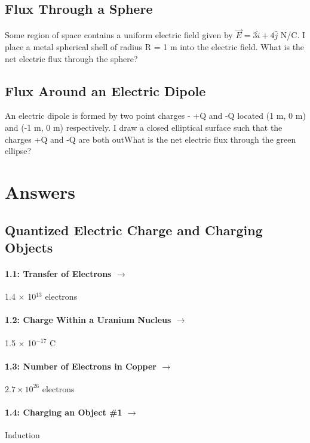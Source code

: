 \documentclass[11pt]{article}
\begin{document}
\subsection{Flux Through a Sphere}
Some region of space contains a uniform electric field given by $\vec{E} = 3\hat{i} + 4\hat{j}$ N/C.  I place a metal spherical shell of radius R = 1 m into the electric field.  What is the net electric flux through the sphere?

\subsection{Flux Around an Electric Dipole}
An electric dipole is formed by two point charges - +Q and -Q located (1 m, 0 m) and (-1 m, 0 m) respectively.  I draw a closed elliptical surface such that the charges +Q and -Q are both outWhat is the net electric flux through the green ellipse?


\pagebreak
\section{Answers}
\vspace{15pt}

\subsection*{Quantized Electric Charge and Charging Objects}
\vspace{5pt}
\paragraph{1.1: Transfer of Electrons $\rightarrow$} 1.4 $\times$ 10$^{13}$ electrons
\paragraph{1.2: Charge Within a Uranium Nucleus $\rightarrow$} 1.5 $\times$ 10$^{-17}$ C
\paragraph{1.3: Number of Electrons in Copper $\rightarrow$} $2.7 \times 10^{26}$ electrons
\paragraph{1.4: Charging an Object \#1 $\rightarrow$} Induction
\end{document}
